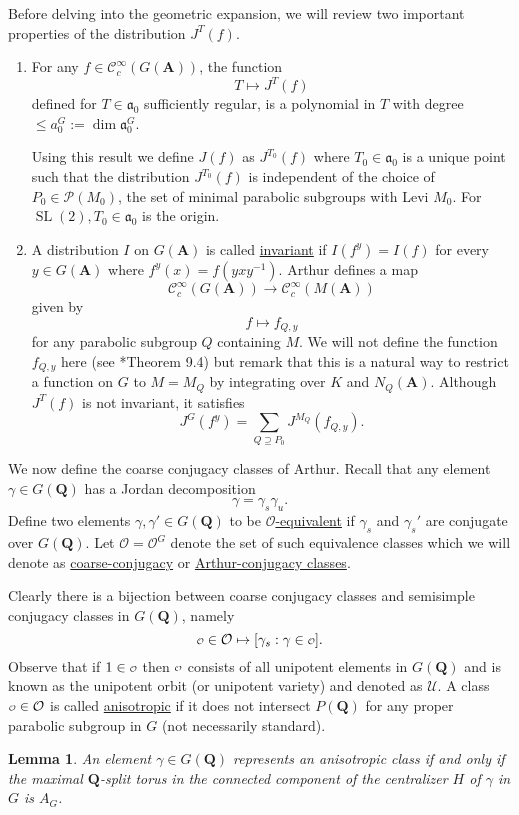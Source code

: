 \documentclass[11pt]{amsart}
\def\A{\mathbf A}
\def\Q{\mathbf Q}
\def\CCC{\mathcal C}
\def\PPP{\mathcal P}
\def\O{\mathcal O}
\def\o{\scalebox{0.8}{$\scriptstyle\mathcal{O}$}}
\def\UUU{\mathcal U}
\def\aaa{\mathfrak a}
\def\cb#1{{\color{black}#1}}
\def\dim{\operatorname{dim}}
\def\sl{\operatorname{SL}}
\newtheorem{lemma}[theorem]{Lemma}
\theoremstyle{remark}
\begin{document}
Before delving into the geometric expansion, we will review two important properties of the distribution $J^T(f)$. 
\begin{enumerate}
	\item For any $f \in \CCC_c^\infty(G(\A))$, the function
		\[ T \mapsto J^T(f) \]
		defined for $T \in \aaa_0$ sufficiently regular, is a polynomial in $T$ with degree $\leq a_0^G := \dim \aaa_0^G$. 
		
		Using this result we define $J(f)$ as $J^{T_0}(f)$ where $T_0 \in \aaa_0$ is a unique point such that the distribution $J^{T_0}(f)$ is independent of the choice of $P_0 \in \PPP(M_0)$, the set of minimal parabolic subgroups with Levi $M_0$. \cb{For $\sl(2), T_0 \in \aaa_0$ is the origin.}
		
	\item A distribution $I$ on $G(\A)$ is called \underline{invariant} if $I(f^y) = I(f)$ for every $y \in G(\A)$ where $f^y(x) = f(yxy^{-1})$. Arthur defines a map
	\[ \CCC_c^\infty(G(\A)) \to \CCC_c^\infty(M(\A)) \]
	given by
	\[ f \mapsto f_{Q, y} \]
	for any parabolic subgroup $Q$ containing $M$. We will not define the function $f_{Q, y}$ here (see \cite{clay}*{Theorem 9.4}) but remark that this is a natural way to restrict a function on $G$ to $M = M_Q$ by integrating over $K$ and $N_Q(\A)$. Although $J^T(f)$ is not invariant, it satisfies
	\[ J^G(f^y) = \sum_{Q \supseteq P_0} J^{M_Q}(f_{Q, y}). \]
\end{enumerate}

We now define the coarse conjugacy classes of Arthur. Recall that any element $\gamma \in G(\Q)$ has a Jordan decomposition
\[ \gamma = \gamma_s \gamma_u. \]
Define two elements $\gamma, \gamma' \in G(\Q)$ to be \underline{$\O$-equivalent} if $\gamma_s$ and $\gamma_s'$ are conjugate over $G(\Q)$. Let $\O = \O^G$ denote the set of such equivalence classes which we will denote as \underline{coarse-conjugacy} or \underline{Arthur-conjugacy classes}. 

Clearly there is a bijection between coarse conjugacy classes and semisimple conjugacy classes in $G(\Q)$, namely 
\[ \o \in \O \mapsto [\gamma_s : \gamma \in \o ]. \]
Observe that if $1 \in \o$ then $\o$ consists of all unipotent elements in $G(\Q)$ and is known as the unipotent orbit (or unipotent variety) and denoted as $\UUU$. A class $\o \in \O$ is called \underline{anisotropic} if it does not intersect $P(\Q)$ for any proper parabolic subgroup in $G$ (not necessarily standard). 

\begin{lemma}
	An element $\gamma \in G(\Q)$ represents an anisotropic class if and only if the maximal $\Q$-split torus in the connected component of the centralizer $H$ of $\gamma$ in $G$ is $A_G$. 
\end{lemma}
\end{document}
